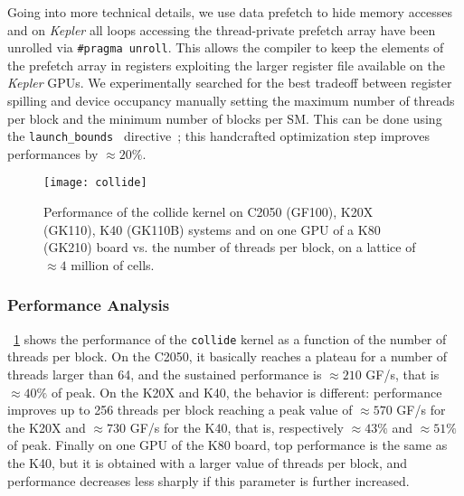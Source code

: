 \documentclass{elsarticle}
\begin{document}
%
Going into more technical details, we use data prefetch to hide memory 
accesses and on {\em Kepler} all loops accessing the thread-private prefetch 
array have been unrolled via {\tt \#pragma unroll}. 
This allows the compiler to keep the elements 
of the prefetch array in registers exploiting the larger register 
file available on the {\em Kepler} GPUs. 
%
We experimentally searched for the best tradeoff between register spilling 
and device occupancy manually setting the maximum number of threads per block
and the minimum number of blocks per SM. This can be done using the 
{\tt launch\_bounds } directive~\cite{cuda}; this handcrafted optimization
step  improves performances by $\approx 20\%$.
 
%
\begin{figure}[!t]
\texttt{[image: collide]}
\caption{Performance of the collide kernel on C2050 (GF100), K20X (GK110), 
K40 (GK110B) systems and on one GPU of a K80 (GK210) board vs. 
the number of threads per block, on a lattice of $\approx 4$ million of 
cells.}
\label{collide-bench}
\end{figure}
%

\subsubsection*{Performance Analysis}

\figurename~\ref{collide-bench} shows the performance of the {\tt collide} kernel 
as a function of the number of threads per block. 
%
On the C2050, it basically reaches a plateau for a number of threads 
larger than 64, and the sustained performance is 
$\approx 210$ GF/s, that is $\approx 40\%$ of peak. 
%
On the K20X and K40, the behavior is different: 
performance improves up to 256 threads per block reaching a peak value of 
$\approx 570$ GF/s for the K20X and $\approx 730$ GF/s for the K40, 
that is, respectively $\approx 43\%$ and $\approx 51\%$ of 
peak. 
%
Finally on one GPU of the K80 board, top performance is the same as the K40, but it is 
obtained with a larger value of threads per block, and performance 
decreases less sharply if this parameter is further increased.
\end{document}

